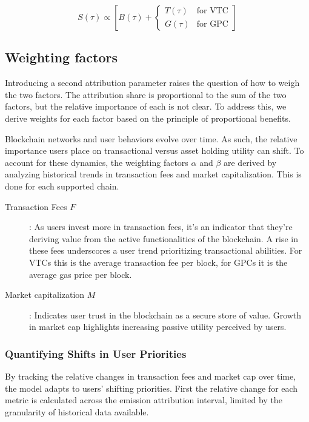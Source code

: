 \documentclass[11pt]{report}
\begin{document}
\begin{equation}
    S(\tau) \propto \left[B(\tau) + \begin{cases}
            T(\tau) & \text{for VTC} \\
            G(\tau) & \text{for GPC}
        \end{cases}\right]
    \label{eq:attribution_share_chain_type}
\end{equation}

\subsection{Weighting factors}

Introducing a second attribution parameter raises the question of how to weigh the two factors. The attribution share is proportional to the sum of the two factors, but the relative importance of each is not clear. To address this, we derive weights for each factor based on the principle of proportional benefits.

Blockchain networks and user behaviors evolve over time. As such, the relative importance users place on transactional versus asset holding utility can shift. To account for these dynamics, the weighting factors $\alpha$ and $\beta$ are derived by analyzing historical trends in transaction fees and market capitalization. This is done for each supported chain.

\begin{description}
    \item[Transaction Fees $F$]: As users invest more in transaction fees, it's an indicator that they're deriving value from the active functionalities of the blockchain. A rise in these fees underscores a user trend prioritizing transactional abilities. For \ac{VTC}s this is the average transaction fee per block, for \ac{GPC}s it is the average gas price per block.
    \item[Market capitalization $M$]: Indicates user trust in the blockchain as a secure store of value. Growth in market cap highlights increasing passive utility perceived by users.
\end{description}

\subsubsection{Quantifying Shifts in User Priorities}

By tracking the relative changes in transaction fees and market cap over time, the model adapts to users' shifting priorities. First the relative change for each metric is calculated across the emission attribution interval, limited by the granularity of historical data available.
\end{document}
